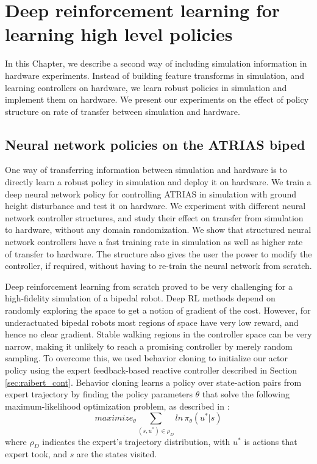 \chapter{Deep reinforcement learning for learning high level policies}

\label{chap:deep}

In this Chapter, we describe a second way of including simulation information in hardware experiments. Instead of building feature transforms in simulation, and learning controllers on hardware, we learn robust policies in simulation and implement them on hardware. We present our experiments on the effect of policy structure on rate of transfer between simulation and hardware.

\section{Neural network policies on the ATRIAS biped}

One way of transferring information between simulation and hardware is to directly learn a robust policy in simulation and deploy it on hardware. We train a deep neural network policy for controlling ATRIAS in simulation with ground height disturbance and test it on hardware. We experiment with different neural network controller structures, and study their effect on transfer from simulation to hardware, without any domain randomization. We show that structured neural network controllers have a fast training rate in simulation as well as higher rate of transfer to hardware. The structure also gives the user the power to modify the controller, if required, without having to re-train the neural network from scratch.

Deep reinforcement learning from scratch proved to be very challenging for a high-fidelity simulation of a bipedal robot. Deep RL methods depend on randomly exploring the space to get a notion of gradient of the cost. However, for underactuated bipedal robots most regions of space have very low reward, and hence no clear gradient. Stable walking regions in the controller space can be very narrow, making it unlikely to reach a promising controller by merely random sampling. To overcome this, we used behavior cloning to initialize our actor policy using the expert feedback-based reactive controller described in Section \ref{sec:raibert_cont}. Behavior cloning learns a policy over state-action pairs from expert trajectory by finding the policy parameters $\theta$ that solve the following maximum-likelihood optimization problem, as described in  \cite{rajeswaran2017learning}: 
\begin{equation}
    maximize_\theta \sum_{(s,u^*) \in \rho_D} ln \, \pi_\theta (u^*|s)
\end{equation}
where $\rho_D$ indicates the expert's trajectory distribution, with  $u^*$ is actions that expert took, and $s$ are the states visited.

